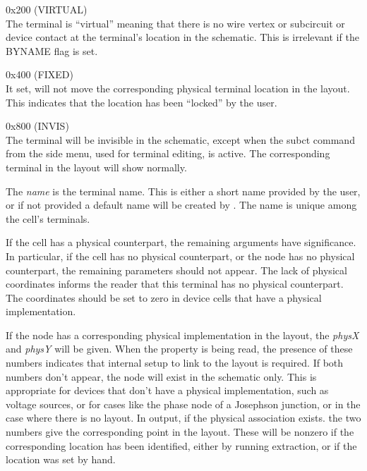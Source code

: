 \begin{description}
\begin{description}
\item{\vt 0x200} (VIRTUAL)\\
The terminal is ``virtual'' meaning that there is no wire vertex or
subcircuit or device contact at the terminal's location in the
schematic.  This is irrelevant if the BYNAME flag is set.

\item{\vt 0x400} (FIXED)\\
It set, {\Xic} will not move the corresponding physical terminal
location in the layout.  This indicates that the location has been
``locked'' by the user.

\item{\vt 0x800} (INVIS)\\
The terminal will be invisible in the schematic, except when the {\cb
subct} command from the side menu, used for terminal editing, is
active.  The corresponding terminal in the layout will show normally.
\end{description}

The {\it name} is the terminal name.  This is either a short name
provided by the user, or if not provided a default name will be
created by {\Xic}.  The name is unique among the cell's terminals.

If the cell has a physical counterpart, the remaining arguments have
significance.  In particular, if the cell has no physical counterpart,
or the node has no physical counterpart, the remaining parameters
should not appear.  The lack of physical coordinates informs the
reader that this terminal has no physical counterpart.  The
coordinates should be set to zero in device cells that have a physical
implementation.

If the node has a corresponding physical implementation in the layout,
the {\it physX} and {\it physY} will be given.  When the property is
being read, the presence of these numbers indicates that internal
setup to link to the layout is required.  If both numbers don't
appear, the node will exist in the schematic only.  This is
appropriate for devices that don't have a physical implementation,
such as voltage sources, or for cases like the phase node of a
Josephson junction, or in the case where there is no layout.  In
output, if the physical association exists.  the two numbers give the
corresponding point in the layout.  These will be nonzero if the
corresponding location has been identified, either by running
extraction, or if the location was set by hand.


\end{description}
